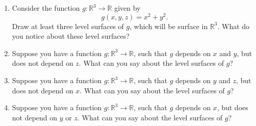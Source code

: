 \begin{problem}

\begin{enumerate}
\item Consider the function $g:\mathbb{R}^3\rightarrow\mathbb{R}$ given by
\[
g(x,y,z) = x^2+y^2.
\]
Draw at least three level surfaces of $g$, which will be surface in $\mathbb{R}^3$. What do you notice about these level surfaces?
\item Suppose you have a function $g:\mathbb{R}^3\rightarrow\mathbb{R}$, such that $g$ depends on $x$ and $y$, but does not depend on $z$. What can you say about the level surfaces of $g$? 
\item Suppose you have a function $g:\mathbb{R}^3\rightarrow\mathbb{R}$, such that $g$ depends on $y$ and $z$, but does not depend on $x$. What can you say about the level surfaces of $g$? 
\item Suppose you have a function $g:\mathbb{R}^3\rightarrow\mathbb{R}$, such that $g$ depends on $x$, but does not depend on $y$ or $z$. What can you say about the level surfaces of $g$? 
\end{enumerate}
\end{problem}